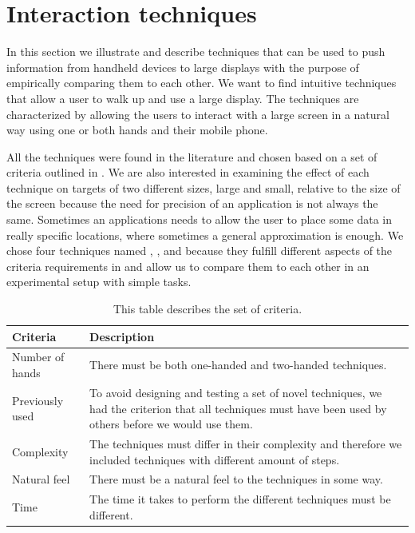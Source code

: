 \section{Interaction techniques} \label{sec:techniques}
In this section we illustrate and describe techniques that can be used to push information from handheld devices to large displays with the purpose of empirically comparing them to each other.
We want to find intuitive techniques that allow a user to walk up and use a large display.
The techniques are characterized by allowing the users to interact with a large screen in a natural way using one or both hands and their mobile phone.

All the techniques were found in the literature and chosen based on a set of criteria outlined in . 
We are also interested in examining the effect of each technique on targets of two different sizes, large and small, relative to the size of the screen because the need for precision of an application is not always the same. 
Sometimes an applications needs to allow the user to place some data in really specific locations, where sometimes a general approximation is enough.
We chose four techniques named \pinch, \swipe, \throw and \tilt because they fulfill different aspects of the criteria requirements in  and allow us to compare them to each other in an experimental setup with simple tasks.

\begin{table}[H]
	\centering
	\begin{tabular}{|p{}|p{}|}
		\hline
		\rowcolor[HTML]{9B9B9B} 
		\textbf{Criteria} & \textbf{Description} \\ \hline
		Number of hands & There must be both one-handed and two-handed techniques. \\ \hline
		Previously used & To avoid designing and testing a set of novel techniques, we had the criterion that all techniques must have been used by others before we would use them. \\ \hline
		Complexity & The techniques must differ in their complexity and therefore we included techniques with different amount of steps. \\ \hline
		Natural feel & There must be a natural feel to the techniques in some way. \\ \hline
		Time & The time it takes to perform the different techniques must be different. \\ \hline
	\end{tabular}
	\caption{This table describes the set of criteria.}
	\label{tab:techniqueCriteria}
\end{table}

